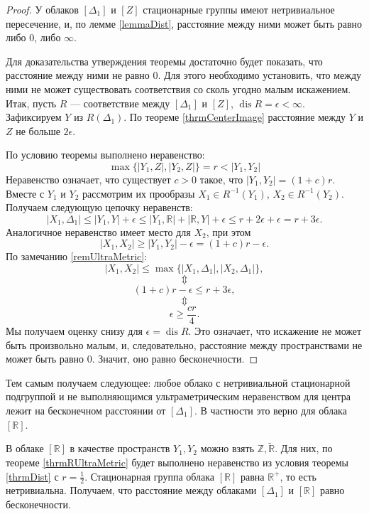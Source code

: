 \documentclass[11pt,twoside,draft
]{article}
\DeclareMathOperator{\dis}{dis}
\begin{document}
\begin{proof}
  У облаков $[\Delta_1]$ и $[Z]$ стационарные группы имеют
  нетривиальное пересечение, и, по лемме \ref{lemmaDist},
  расстояние между ними может быть
  равно либо $0$, либо $\infty$.

  Для доказательства утверждения теоремы
  достаточно будет показать, что расстояние между ними не равно $0$.  Для этого
  необходимо установить, что между ними не может существовать соответствия со
  сколь угодно малым искажением. Итак, пусть $R$ --- соответствие между
  $[\Delta_1]$ и $[Z]$, $\dis R = \epsilon < \infty$.
  Зафиксируем $Y$ из $R(\Delta_1)$. По теореме \ref{thrmCenterImage}
  расстояние между $Y$ и $Z$ не
  больше $2\epsilon$.

  По условию теоремы выполнено неравенство:
  $$\max\big\{ |Y_{1},Z|, |Y_{2}, Z| \big\} = r < |Y_{1}, Y_{2}|$$
  Неравенство означает, что существует $c > 0$ такое, что
  $|Y_{1},Y_{2}| = (1 + c)r.$ Вместе с $Y_{1}$ и
  $ Y_{2}$ рассмотрим их прообразы $X_1 \in R^{-1}(Y_{1})$,
  $ X_2 \in R^{-1}(Y_{2})$. Получаем следующую цепочку
  неравенств:
  $$|X_1, \Delta_1| \le |Y_{1}, Y| + \epsilon \le |Y_{1}, \mathbb{R}|
  + |\mathbb{R}, Y| +\epsilon \le r + 2\epsilon + \epsilon = r + 3\epsilon.$$
  Аналогичное неравенство имеет место для $X_2$, при этом
  $$|X_1, X_2|  \ge |Y_{1}, Y_{2}| - \epsilon = (1+c)r - \epsilon.$$
  По замечанию \ref{remUltraMetric}:
  $$|X_1, X_2| \le \max\big\{ |X_1, \Delta_1|, |X_2, \Delta_1| \big\},$$
  $$\Updownarrow$$
  $$(1+c)r - \epsilon\le r + 3\epsilon,$$
  $$\Updownarrow$$
  $$\epsilon \ge \frac{cr}{4}.$$
  Мы получаем оценку снизу для $\epsilon = \dis R$. Это означает, что
  искажение не может быть произвольно малым, и, следовательно, расстояние между
  пространствами не может быть равно 0. Значит, оно равно бесконечности.

\end{proof}

Тем самым получаем следующее: любое облако с нетривиальной
стационарной подгруппой
и не выполняющимся ультраметрическим неравенством для центра лежит
на бесконечном расстоянии от $[\Delta_{1}]$. В частности это верно
для облака $[\mathbb{R}]$.

\begin{corollary}
  В облаке $[\mathbb{R}]$ в качестве пространств $Y_{1}, Y_{2}$ можно взять
  $\mathbb{Z}, \widetilde{\mathbb{R}}$. Для них, по теореме
  \ref{thrmRUltraMetric} будет выполнено
  неравенство из условия теоремы
  \ref{thrmDist}
  с $r = \frac 1 2$. Стационарная группа облака
  $[\mathbb{R}]$ равна $\mathbb{R}^{+}$, то есть нетривиальна.
  Получаем, что расстояние между облаками
  $[\Delta_{1}]$ и $[\mathbb{R}]$ равно бесконечности.
\end{corollary}
\end{document}
